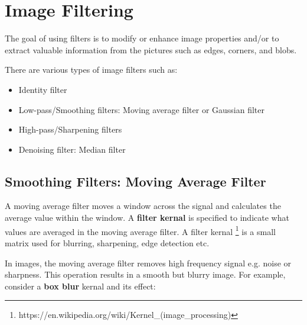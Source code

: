 \documentclass{report}
\begin{document}
\chapter{Image Filtering}

The goal of using filters is to modify or enhance image properties and/or to
extract valuable information from the pictures such as edges, corners, and
blobs.

There are various types of image filters such as:
\begin{itemize}
    \item Identity filter
    \item Low-pass/Smoothing filters: Moving average filter or Gaussian filter 
    \item High-pass/Sharpening filters 
    \item Denoising filter: Median filter
\end{itemize}

\section{Smoothing Filters: Moving Average Filter}

A moving average filter moves a window across the signal and calculates the
average value within the window. A \textbf{filter kernal} is specified to
indicate what values are averaged in the moving average filter. A filter
kernal \footnote{https://en.wikipedia.org/wiki/Kernel\_(image\_processing)}
is a small matrix used for blurring, sharpening, edge detection etc. 

In images, the moving average filter removes high frequency signal e.g. noise or
sharpness. This operation results in a smooth but blurry image. For example,
consider a \textbf{box blur} kernal and its effect:

\begin{minipage}{7in}
    \centering
    \hspace*{.2in}
\end{minipage}
\end{document}
